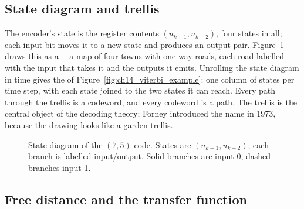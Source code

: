 \subsection{State diagram and trellis}

The encoder's state is the register contents $(u_{k-1},u_{k-2})$, four states in all; each input
bit moves it to a new state and produces an output pair. Figure~\ref{fig:ch14_state} draws this as
a ---a map of four towns with one-way roads, each road labelled with the input
that takes it and the outputs it emits. Unrolling the state diagram in time gives the 
of Figure~\ref{fig:ch14_viterbi_example}: one column of states per time step, with each state joined
to the two states it can reach. Every path through the trellis is a codeword, and every codeword is a
path. The trellis is the central object of the decoding theory; Forney introduced the name in 1973,
because the drawing looks like a garden trellis.

\begin{figure}[htbp]\centering
{}
\caption{State diagram of the $(7,5)$ code. States are $(u_{k-1},u_{k-2})$; each branch is labelled
input/output. Solid branches are input 0, dashed branches input 1.}
\label{fig:ch14_state}
\end{figure}

\subsection{Free distance and the transfer function}

